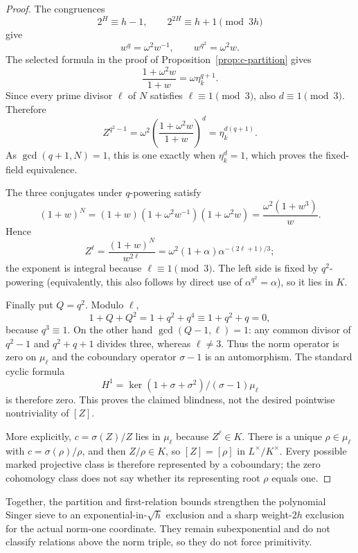 \documentclass[11pt]{article}
\theoremstyle{definition}
\theoremstyle{remark}
\begin{document}
\begin{proof}
The congruences
\[
 2^H\equiv h-1,\qquad 2^{2H}\equiv h+1\pmod{3h}
\]
give
\[
 w^q=\omega^2w^{-1},\qquad w^{q^2}=\omega^2w.
\]
The selected formula in the proof of
Proposition~\ref{prop:c-partition} gives
\[
 \frac{1+\omega^2w}{1+w}=\omega\eta_k^{q+1}.
\]
Since every prime divisor $\ell$ of $N$ satisfies
$\ell\equiv1\pmod3$, also $d\equiv1\pmod3$.  Therefore
\[
 Z^{q^2-1}
 =\omega^2\left(\frac{1+\omega^2w}{1+w}\right)^d
 =\eta_k^{d(q+1)}.
\]
As $\gcd(q+1,N)=1$, this is one exactly when $\eta_k^d=1$,
which proves the fixed-field equivalence.

The three conjugates under $q$-powering satisfy
\[
 (1+w)^N
 =(1+w)(1+\omega^2w^{-1})(1+\omega^2w)
 =\frac{\omega^2(1+w^3)}w.
\]
Hence
\[
 Z^\ell=\frac{(1+w)^N}{w^{2\ell}}
 =\omega^2(1+\alpha)\alpha^{-(2\ell+1)/3};
\]
the exponent is integral because $\ell\equiv1\pmod3$.  The left side is
fixed by $q^2$-powering (equivalently, this also follows by direct use of
$\alpha^{q^2}=\alpha$), so it lies in $K$.

Finally put $Q=q^2$.  Modulo $\ell$,
\[
 1+Q+Q^2=1+q^2+q^4\equiv1+q^2+q=0,
\]
because $q^3\equiv1$.  On the other hand
$\gcd(Q-1,\ell)=1$: any common divisor of $q^2-1$ and
$q^2+q+1$ divides three, whereas $\ell\ne3$.  Thus the norm operator is
zero on $\mu_\ell$ and the coboundary operator $\sigma-1$ is an
automorphism.  The standard cyclic formula
\[
 H^1=\ker(1+\sigma+\sigma^2)/(\sigma-1)\mu_\ell
\]
is therefore zero.  This proves the claimed blindness, not the desired
pointwise nontriviality of $[Z]$.

More explicitly, $c=\sigma(Z)/Z$ lies in $\mu_\ell$ because $Z^\ell\in K$.
There is a unique $\rho\in\mu_\ell$ with
$c=\sigma(\rho)/\rho$, and then $Z/\rho\in K$, so $[Z]=[\rho]$ in
$L^\times/K^\times$.  Every possible marked projective class is therefore
represented by a coboundary; the zero cohomology class does not say whether
its representing root $\rho$ equals one.
\end{proof}

Together, the partition and first-relation bounds strengthen the polynomial
Singer sieve to an exponential-in-$\sqrt h$ exclusion and a sharp
weight-$2h$ exclusion for the actual norm-one coordinate.  They remain
subexponential and do not classify relations above the norm triple, so they
do not force primitivity.
\end{document}
